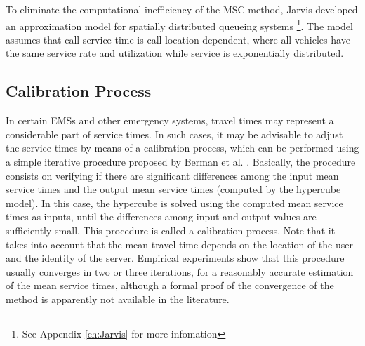 To eliminate the computational inefficiency of the MSC method,
Jarvis \cite{jarvis1985approximating} developed
an approximation model
for spatially distributed queueing systems
\footnote{See Appendix \ref{ch:Jarvis} for more infomation}.
The model assumes that call service time
is call location-dependent,
where all vehicles
have the same service rate and utilization
while service is exponentially distributed.

\subsection{Calibration Process}
In certain EMSs
and other emergency systems,
travel times may represent
a considerable part of service times.
In such cases,
it may be advisable
to adjust the service times
by means of a calibration process,
which can be performed
using a simple iterative procedure
proposed by Berman et al. \cite{berman1987stochastic}.
Basically,
the procedure consists on
verifying
if there are
significant differences among the input mean service times
and the output mean service times (computed by the hypercube model).
In this case,
the hypercube is solved
using the computed mean service times as inputs,
until
the differences
among input and output values
are sufficiently small.
This procedure is called
a calibration process.
Note that
it takes into account
that the mean travel time
depends on the location of the user
and the identity of the server.
Empirical experiments show
that this procedure
usually converges in two or three iterations,
for a reasonably accurate estimation of the mean service times,
although a formal proof of the convergence of the method
is apparently not available in the literature.
